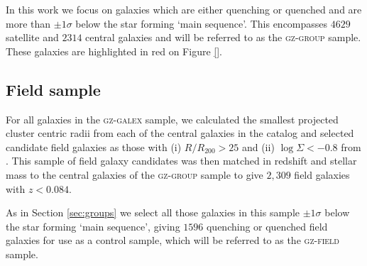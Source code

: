 \documentclass[useAMS,usenatbib]{mn2e}
\begin{document}
In this work we focus on galaxies which are either quenching or quenched and are more than $\pm1\sigma$ below the star forming `main sequence'. This encompasses $4629$ satellite and $2314$ central galaxies and will be referred to as the \textsc{gz-group} sample. These galaxies are highlighted in red on Figure \ref{}. 

\subsection{Field sample}\label{sec:field}

For all galaxies in the \textsc{gz-galex} sample, we calculated the smallest projected cluster centric radii from each of the central galaxies in the  \citet{berlind06} catalog and selected candidate field galaxies as those with (i) $R/R_{200} > 25$ and (ii) $\log\Sigma < -0.8$ from \cite{baldry06}. This sample of field galaxy candidates was then matched in redshift and stellar mass to the central galaxies of the \textsc{gz-group} sample to give $2,309$ field galaxies with $z < 0.084$.  

As in Section \ref{sec:groups} we select all those galaxies in this sample $\pm1\sigma$ below the star forming `main sequence', giving $1596$ quenching or quenched field galaxies for use as a control sample, which will be referred to as the \textsc{gz-field} sample.
  
\begin{figure}
\label{fig:mosaic}
\end{figure}
\end{document}
